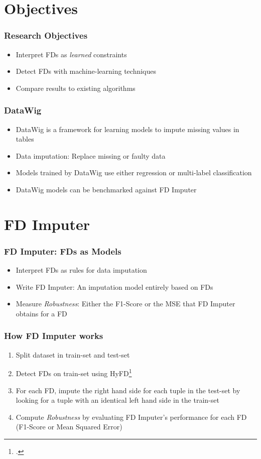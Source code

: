 \documentclass{beamer}
\begin{document}
\section{Objectives}
\begin{frame}
    \frametitle{Research Objectives}
    \begin{itemize}
        \item Interpret FDs as \emph{learned} constraints
        \item Detect FDs with machine-learning techniques
        \item Compare results to existing algorithms
    \end{itemize}
\end{frame}

\begin{frame}
    \frametitle{DataWig}
    \begin{itemize}
        \item DataWig is a framework for learning models to impute missing values in tables
        \item Data imputation: Replace missing or faulty data
        \item Models trained by DataWig use either regression or multi-label classification
        \item DataWig models can be benchmarked against FD Imputer
    \end{itemize}
\end{frame}

\section{FD Imputer}
\begin{frame}
    \frametitle{FD Imputer: FDs as Models}
    \begin{itemize}
        \item Interpret FDs as rules for data imputation
        \item Write FD Imputer: An imputation model entirely based on FDs
        \item Measure \emph{Robustness}: Either the F1-Score or the MSE that FD Imputer obtains for a FD
    \end{itemize}
\end{frame}

\begin{frame}
    \frametitle{How FD Imputer works}
    \begin{enumerate}
        \item Split dataset in train-set and test-set
        \item Detect FDs on train-set using HyFD\footcite{PAP16}
        \item For each FD, impute the right hand side for each tuple in the test-set by looking for a tuple with an identical left hand side in the train-set
        \item Compute \emph{Robustness} by evaluating FD Imputer's performance for each FD (F1-Score or Mean Squared Error)
    \end{enumerate}
\end{frame}
\end{document}
